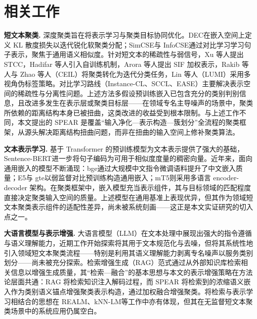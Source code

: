 \documentclass[10.5pt,compsoc,UTF8]{CjC}
\theoremstyle{mystyle}
\begin{document}
\section{\heiti 相关工作}
\label{sec:related}

\textbf{短文本聚类.} 深度聚类旨在将表示学习与聚类目标协同优化。DEC\cite{xie2016}在嵌入空间上定义 KL 散度损失以迭代锐化软聚类分配；SimCSE\cite{gao2021}与 InfoCSE\cite{wu2022}通过对比学习学习句子表示，聚焦于通用语义相似度。针对短文本的稀疏性与弱信号，Xu 等人\cite{xu2017}提出 STCC，Hadifar 等人\cite{hadifar2019}引入自训练机制，Arora 等人\cite{arora2017}提出 SIF 加权表示，Rakib 等人\cite{rakib2020}与 Zhao 等人\cite{zhao2023}（CEIL）将聚类转化为迭代分类任务，Lin 等人\cite{lin2025}（LUMI）采用多视角伪标签策略。对比学习路线（Instance-CL\cite{chen2020,he2020}、SCCL\cite{zhang2021}、EASE\cite{nishikawa2022}）主要解决表示空间的稀疏性与分离性问题。上述方法多假设预训练嵌入已包含充分的类别判别信息，且改进多发生在表示层或聚类目标层——在领域专名主导噪声的场景中，聚类所依赖的距离结构本身已被扭曲，这类改进的收益受到根本限制。与上述工作不同，本文提出的 SPEAR 是覆盖``输入净化—表示构造—簇划分''全流程的聚类框架，从源头解决距离结构扭曲问题，而非在扭曲的输入空间上修补聚类算法。

\textbf{文本表示学习.} 基于 Transformer 的预训练模型\cite{devlin2019}为文本表示提供了强大的基础，Sentence-BERT\cite{reimers2019}进一步将句子编码为可用于相似度度量的稠密向量。近年来，面向通用嵌入的模型不断涌现：bge\cite{xiao2023}通过大规模中文指令微调语料提升了中文嵌入质量；E5\cite{wang2022}与 gte\cite{li2023}以弱监督对比预训练构造通用嵌入；mT5\cite{xue2021}则采用多语言 encoder-decoder 架构。在聚类框架中，嵌入模型充当表示组件，其与目标领域的匹配程度直接决定聚类输入空间的质量。上述模型在通用基准上表现优异，但其作为领域短文本聚类表示组件的适配性差异，尚未被系统刻画——这正是本文实证研究的切入点之一。

\textbf{大语言模型与表示增强.} 大语言模型（LLM）在文本处理中展现出强大的指令遵循与语义理解能力\cite{brown2020,ouyang2022}，近期工作开始探索将其用于文本规范化与去噪，但将其系统性地引入领域短文本聚类流程——特别是利用其语义理解能力剥离专名噪声以服务类别划分——尚未被充分探索。检索增强生成（RAG）范式\cite{lewis2020}通过从外部知识库检索相关信息以增强生成质量，其``检索—融合''的基本思想与本文的表示增强策略在方法论层面共通：RAG 将检索知识注入解码过程，而 SPEAR 将检索到的浓缩语义嵌入作为类别语义锚点增强聚类表示构造，通过加权融合增强聚类。将检索与表示学习相结合的思想在 REALM\cite{guu2020}、kNN-LM\cite{khandelwal2019}等工作中亦有体现，但其在无监督短文本聚类场景中的系统应用仍属空白。
\end{document}
